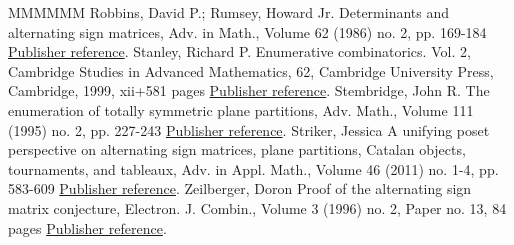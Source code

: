 \documentclass[11pt]{article}
\theoremstyle{definition}
\numberwithin{equation}{section}
\newcounter{x}
\newcounter{y}
\begin{document}
\begin{thebibliography}{MMMMMM}
 Robbins, David P.; Rumsey, Howard Jr. Determinants and alternating sign matrices, Adv. in Math., Volume 62 (1986) no. 2, pp. 169-184 \href{https://alco.centre-mersenne.org/articles/10.5802/alco.374/#RobbinsRumsey86}{Publisher reference}.
 Stanley, Richard P. Enumerative combinatorics. Vol. 2, Cambridge Studies in Advanced Mathematics, 62, Cambridge University Press, Cambridge, 1999, xii+581 pages \href{https://alco.centre-mersenne.org/articles/10.5802/alco.374/#Stanley99}{Publisher reference}.
 Stembridge, John R. The enumeration of totally symmetric plane partitions, Adv. Math., Volume 111 (1995) no. 2, pp. 227-243 \href{https://alco.centre-mersenne.org/articles/10.5802/alco.374/#Stembridge95}{Publisher reference}.
 Striker, Jessica A unifying poset perspective on alternating sign matrices, plane partitions, Catalan objects, tournaments, and tableaux, Adv. in Appl. Math., Volume 46 (2011) no. 1-4, pp. 583-609 \href{https://alco.centre-mersenne.org/articles/10.5802/alco.374/#Striker11}{Publisher reference}.
 Zeilberger, Doron Proof of the alternating sign matrix conjecture, Electron. J. Combin., Volume 3 (1996) no. 2, Paper no. 13, 84 pages \href{https://alco.centre-mersenne.org/articles/10.5802/alco.374/#Zeilberger96}{Publisher reference}.
\end{thebibliography}
\end{document}
